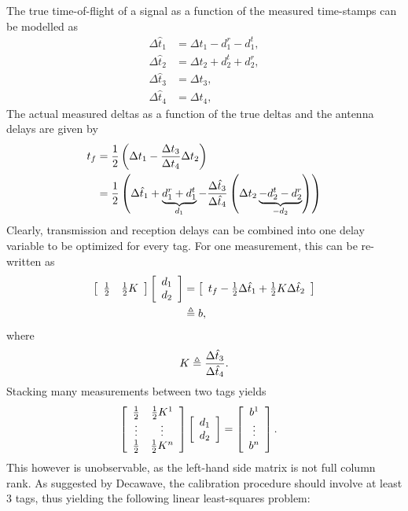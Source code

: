 \documentclass{decar-wsd}    %
\begin{document}
The true time-of-flight of a signal as a function of the measured time-stamps can be modelled as
\begin{align}
    \Delta \hat{t}_1 &= \Delta t_1 - d_1^r - d_1^t, \\
    \Delta \hat{t}_2 &= \Delta t_2 + d_2^t + d_2^r, \\
    \Delta \hat{t}_3 &= \Delta t_3, \\
    \Delta \hat{t}_4 &= \Delta t_4,
\end{align}
The actual measured deltas as a function of the true deltas and the antenna delays are given by
\begin{align}
    t_f &= \f{1}{2} \left( \Delta {t}_1 - \f{ \Delta {t}_3}{\Delta {t}_4} \Delta {t}_2 \right) \\
    &= \f{1}{2} \left( \Delta \hat{t}_1 + \underbrace{ d_1^r + d_1^t}_{d_1} - \f{ \Delta \hat{t}_3}{\Delta \hat{t}_4} \left( \Delta t_2  \underbrace{ - d_2^t - d_2^r}_{-d_2} \right) \right)
\end{align}
Clearly, transmission and reception delays can be combined into one delay variable to be optimized for every tag. For one measurement, this can be re-written as
\begin{align}
    \bma{cc} \f{1}{2} & \f{1}{2}K \ema \bma{c} d_1 \\ d_2 \ema &= \bma{c} t_f - \f{1}{2} \Delta \hat{t}_1 + \f{1}{2} K \Delta \hat{t}_2 \ema \\
    &\triangleq b,
\end{align}
where 
\begin{equation}
    K \triangleq \f{ \Delta \hat{t}_3}{\Delta \hat{t}_4}.
\end{equation}
Stacking many measurements between two tags yields
\begin{align}
    \bma{cc} \f{1}{2} & \f{1}{2}K^1 \\ \vdots & \vdots \\ \f{1}{2} & \f{1}{2}K^n \ema \bma{c} d_1 \\ d_2 \ema &= \bma{c} b^1 \\ \vdots \\ b^n \ema.
\end{align}
This however is unobservable, as the left-hand side matrix is not full column rank. As suggested by Decawave, the calibration procedure should involve at least 3 tags, thus yielding the following linear least-squares problem:
\end{document}
